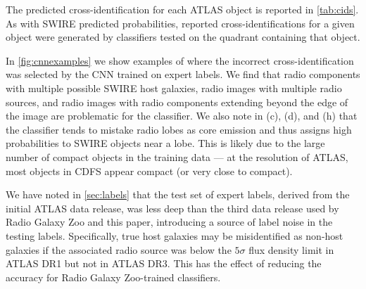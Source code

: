 \documentclass[fleqn,usenatbib,usedcolumn]{mnras}
\begin{document}
    The predicted cross-identification for each ATLAS object is reported in
    \autoref{tab:cids}. As with SWIRE predicted probabilities, reported
    cross-identifications for a given object were generated by classifiers
    tested on the quadrant containing that object.
  
    In \autoref{fig:cnnexamples} we show examples of where the incorrect
    cross-identification was selected by the CNN trained on expert labels. We
    find that radio components with multiple possible SWIRE host galaxies,
    radio images with multiple radio sources, and radio images with radio
    components extending beyond the edge of the image are problematic for the
    classifier. We also note in (c), (d), and (h) that the classifier tends to
    mistake radio lobes as core emission and thus assigns high probabilities
    to SWIRE objects near a lobe. This is likely due to the large number of
    compact objects in the training data --- at the resolution of ATLAS, most
    objects in CDFS appear compact (or very close to compact).

    We have noted in \autoref{sec:labels} that the test set of expert labels,
    derived from the initial ATLAS data release, was less deep than the third
    data release used by Radio Galaxy Zoo and this paper, introducing a source
    of label noise in the testing labels. Specifically, true host galaxies may
    be misidentified as non-host galaxies if the associated radio source was
    below the $5\sigma$ flux density limit in ATLAS DR1 but not in ATLAS DR3.
    This has the effect of reducing the accuracy for Radio Galaxy Zoo-trained
    classifiers.
\end{document}
